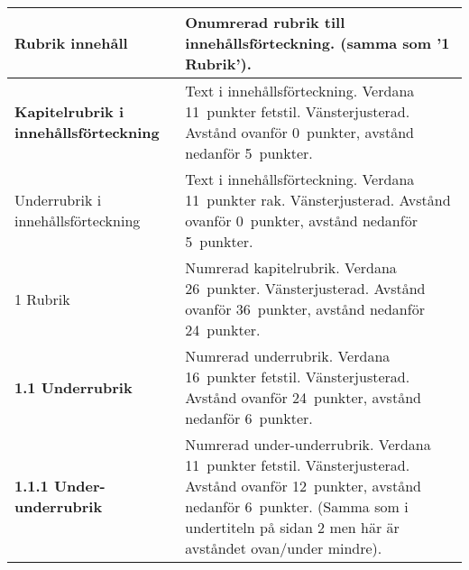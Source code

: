 \begin{longtable}{| p{} | p{} |}
  \hline
  {\sffamily\raggedright\Large{}Rubrik innehåll} &
  Onumrerad rubrik till innehållsförteckning.
  (samma som '1 Rubrik').
  \\\hline
  {\sffamily\textbf{Kapitelrubrik i innehållsförteckning}} &
  Text i innehållsförteckning. Verdana 11~punkter fetstil. Vänsterjusterad.
  Avstånd ovanför 0~punkter, avstånd nedanför 5~punkter.
  \\\hline
  {\sffamily{}Underrubrik i innehållsförteckning} &
  Text i innehållsförteckning. Verdana 11~punkter rak. Vänsterjusterad.
  Avstånd ovanför 0~punkter, avstånd nedanför 5~punkter.
  \\\hline
  {\sffamily\Huge{}1 Rubrik} &
  Numrerad kapitelrubrik. Verdana 26~punkter. Vänsterjusterad.
  Avstånd ovanför 36~punkter, avstånd nedanför 24~punkter.
  \\\hline
  {\sffamily\raggedright\bfseries\large{}1.1 Underrubrik} &
  Numrerad underrubrik. Verdana 16~punkter fetstil. Vänsterjusterad.
  Avstånd ovanför 24~punkter, avstånd nedanför 6~punkter.
  \\\hline
  {\sffamily\raggedright\bfseries\normalsize{}1.1.1 Under-underrubrik} &
  Numrerad under-underrubrik. Verdana 11~punkter fetstil. Vänsterjusterad.
  Avstånd ovanför 12~punkter, avstånd nedanför 6~punkter. (Samma som i
  undertiteln på sidan 2 men här är avståndet ovan/under mindre).
  \\\hline
\end{longtable}


